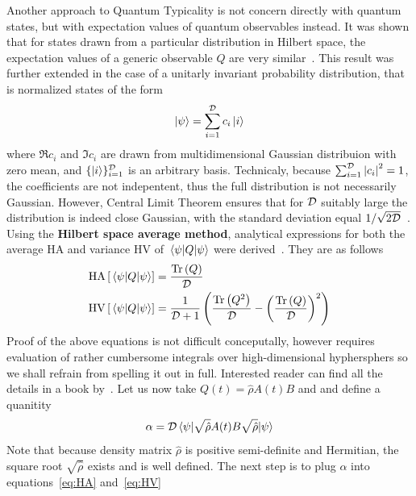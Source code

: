 Another approach to Quantum Typicality is not concern directly with quantum states, but with 
expectation values of quantum observables instead.
It was shown that for states drawn from a particular distribution in Hilbert space, the expectation
values of a generic observable \(Q\) are very similar~\autocite{Reimann2007}. This result was further extended
in the case of a unitarly invariant probability distribution, that is normalized states of the form
\begin{equation}
	\ket{\psi} = \sum_{i = 1}^{\mathcal{D}} c_i \ket{i}
\end{equation} 
where \(\Re c_i\) and \(\Im c_i\) are drawn from multidimensional Gaussian distribuion with zero mean,
and \(\{\ket{i}\}_{i=1}^{\mathcal{D}}\) is an arbitrary basis. Technicaly, because \(\sum_{i=1}^{\mathcal{D}}\abs{c_i}^2 = 1\),
the coefficients are not indepentent, thus the full distribution is not necessarily Gaussian. However,
Central Limit Theorem ensures that for \(\mathcal{D}\) suitably large the distribution is indeed close Gaussian,
with the standard deviation equal \(1/\sqrt{2\mathcal{D}}\)~\autocite{Gemmer2009}.
Using the \textbf{Hilbert space average method}, analytical expressions
for both the average \(\mathrm{HA}\) and variance \(\mathrm{HV}\) of \(\matrixel{\psi}{Q}{\psi}\)
were derived~\autocite{Bartsch2009a}. They are as follows
\begin{align}
	\mathrm{HA}\left[\matrixel{\psi}{Q}{\psi}\right] &= \frac{\Tr\left(Q\right)}{\dimension} \label{eq:HA} \\
	\mathrm{HV}\left[\matrixel{\psi}{Q}{\psi}\right] &= \frac{1}{\dimension + 1}\left(
		\frac{\Tr\left(Q^2\right)}{\dimension} - \left(\frac{\Tr\left(Q\right)}{\dimension}\right)^2
	\right)\label{eq:HV}
\end{align}
Proof of the above equations is not difficult conceputally, however requires evaluation of rather
cumbersome integrals over high-dimensional hyphersphers so we shall refrain from spelling it out in full.
Interested reader can find all the details in a book by~\textcite{Gemmer2009}.
Let us now take \(Q(t) = \hat{\rho}A(t)B\)
and and define a quanitity
\begin{equation}
	\alpha = \dimension \matrixel{\psi}{\sqrt{\hat{\rho}}A(t)B\sqrt{\hat{\rho}}}{\psi}
\end{equation}
Note that because density matrix \(\hat{\rho}\) is positive semi-definite and Hermitian, the
square root \(\sqrt{\hat{\rho}}\) exists and is well defined. The next step is to plug \(\alpha\)
into equations~\eqref{eq:HA} and~\eqref{eq:HV}
